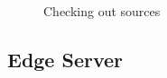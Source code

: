 \documentclass[11pt]{article}
\begin{document}
\begin{figure}
\caption{\label{fig:eclipse8} }
\end{figure}


\begin{figure}
\caption{\label{fig:eclipse9} Checking out sources }
\end{figure}

 \subsection{Edge Server}
\end{document}
